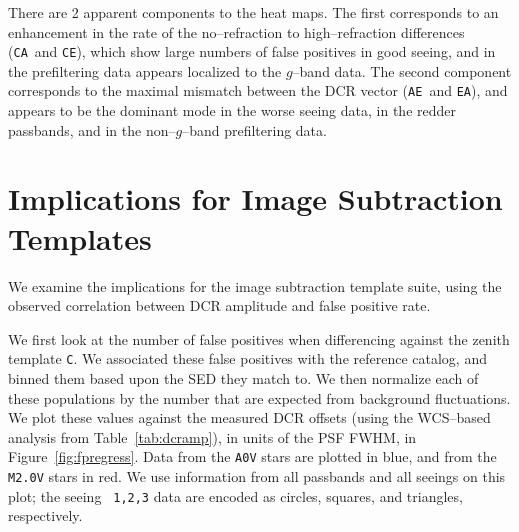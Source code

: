 \documentclass[DM,toc]{lsstdoc}
\def\A{{\tt A}}
\def\C{{\tt C}}
\def\E{{\tt E}}
\begin{document}
There are 2 apparent components to the heat maps.  The first
corresponds to an enhancement in the rate of the no--refraction to
high--refraction differences (\C\A\ and \C\E), which show large
numbers of false positives in good seeing, and in the prefiltering
data appears localized to the $g$--band data.  The second component
corresponds to the maximal mismatch between the DCR vector (\A\E\ and
\E\A), and appears to be the dominant mode in the worse seeing data,
in the redder passbands, and in the non--$g$--band prefiltering data.

\section{Implications for Image Subtraction Templates \label{sec:templates}}

We examine the implications for the image subtraction template suite,
using the observed correlation between DCR amplitude and false positive
rate.

We first look at the number of false positives when differencing
against the zenith template \C.  We associated these false positives
with the reference catalog, and binned them based upon the SED they
match to.  We then normalize each of these populations by the number
that are expected from background fluctuations.  We plot these values
against the measured DCR offsets (using the WCS--based analysis from
Table~\ref{tab:dcramp}), in units of the PSF FWHM, in
Figure~\ref{fig:fpregress}.  Data from the {\tt A0V} stars are plotted
in blue, and from the {\tt M2.0V} stars in red.  We use information
from all passbands and all seeings on this plot; the seeing {\tt
  1,2,3} data are encoded as circles, squares, and triangles,
respectively.
\end{document}
